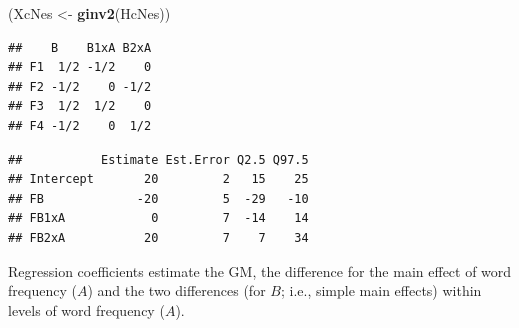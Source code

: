 \documentclass[12pt,]{krantz}
\newenvironment{Shaded}{\begin{snugshade}}{\end{snugshade}}
\newcommand{\KeywordTok}[1]{\textcolor[rgb]{0.13,0.29,0.53}{\textbf{#1}}}
\newcommand{\DataTypeTok}[1]{\textcolor[rgb]{0.13,0.29,0.53}{#1}}
\newcommand{\DecValTok}[1]{\textcolor[rgb]{0.00,0.00,0.81}{#1}}
\newcommand{\StringTok}[1]{\textcolor[rgb]{0.31,0.60,0.02}{#1}}
\newcommand{\OperatorTok}[1]{\textcolor[rgb]{0.81,0.36,0.00}{\textbf{#1}}}
\newcommand{\NormalTok}[1]{#1}
\theoremstyle{definition}
\theoremstyle{definition}
\theoremstyle{definition}
\theoremstyle{remark}
\begin{document}
\begin{Shaded}
\begin{Highlighting}[]
\NormalTok{(XcNes <-}\StringTok{ }\KeywordTok{ginv2}\NormalTok{(HcNes))}
\end{Highlighting}
\end{Shaded}

\begin{verbatim}
##    B    B1xA B2xA
## F1  1/2 -1/2    0
## F2 -1/2    0 -1/2
## F3  1/2  1/2    0
## F4 -1/2    0  1/2
\end{verbatim}

\begin{Shaded}
\end{Shaded}

\begin{verbatim}
##           Estimate Est.Error Q2.5 Q97.5
## Intercept       20         2   15    25
## FB             -20         5  -29   -10
## FB1xA            0         7  -14    14
## FB2xA           20         7    7    34
\end{verbatim}

Regression coefficients estimate the GM, the difference for the main
effect of word frequency (\(A\)) and the two differences (for \(B\);
i.e., simple main effects) within levels of word frequency (\(A\)).
\end{document}
